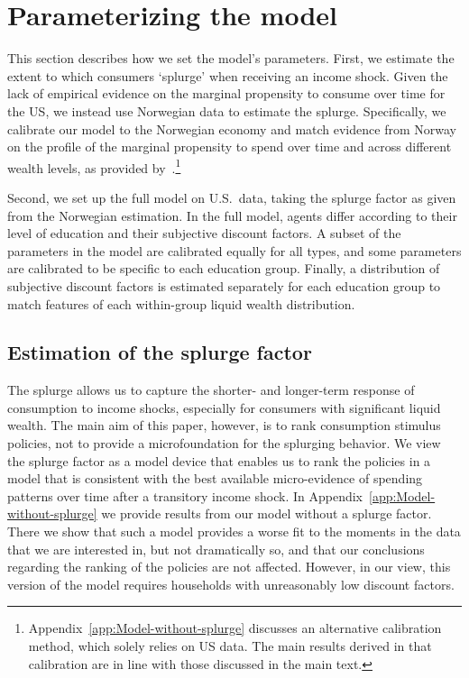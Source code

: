 \documentclass[\latexroot/\projectname]{subfiles}
\begin{document}
\section{Parameterizing the model}
\whenintegrated{\label{sec:parameters}}

This section describes how we set the model's parameters. First, we estimate the extent to which consumers `splurge' when receiving an income shock. Given the lack of empirical evidence on the marginal propensity to consume over time for the US, we instead use Norwegian data to estimate the splurge. Specifically, we calibrate our model to the Norwegian economy and match evidence from Norway on the profile of the marginal propensity to spend over time and across different wealth levels, as provided by~\cite{fagereng-mpc-2021}.\footnote{Appendix~\ref{app:Model-without-splurge} discusses an alternative calibration method, which solely relies on US data. The main results derived in that calibration are in line with those discussed in the main text.}

Second, we set up the full model on U.S.\ data, taking the splurge factor as given from the Norwegian estimation. In the full model, agents differ according to their level of education and their subjective discount factors. A subset of the parameters in the model are calibrated equally for all types, and some parameters are calibrated to be specific to each education group. Finally, a distribution of subjective discount factors is estimated separately for each education group to match features of each within-group liquid wealth distribution.

\subsection{Estimation of the splurge factor}
\whenintegrated{\label{sec:splurge}}

The splurge allows us to capture the shorter- and longer-term response of consumption to income shocks, especially for consumers with significant liquid wealth. The main aim of this paper, however, is to rank consumption stimulus policies, not to provide a microfoundation for the splurging behavior. We view the splurge factor as a model device that enables us to rank the policies in a model that is consistent with the best available micro-evidence of spending patterns over time after a transitory income shock. In Appendix~\ref{app:Model-without-splurge} we provide results from our model without a splurge factor. There we show that such a model provides a worse fit to the moments in the data that we are interested in, but not dramatically so, and that our conclusions regarding the ranking of the policies are not affected. However, in our view, this version of the model requires households with unreasonably low discount factors.
\end{document}
